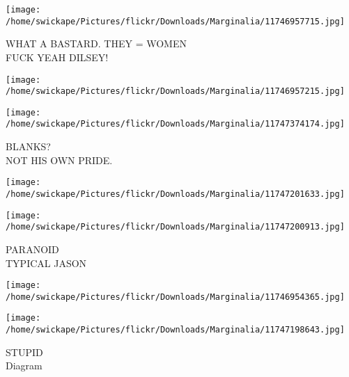 \documentclass[10pt,letterpaper]{article}
\begin{document}
\vspace{0.25in}
\texttt{[image: /home/swickape/Pictures/flickr/Downloads/Marginalia/11746957715.jpg]}

WHAT A BASTARD.  THEY = WOMEN\\
FUCK YEAH DILSEY!
\pagebreak

\texttt{[image: /home/swickape/Pictures/flickr/Downloads/Marginalia/11746957215.jpg]}

\vspace{0.25in}
\texttt{[image: /home/swickape/Pictures/flickr/Downloads/Marginalia/11747374174.jpg]}

BLANKS?\\
NOT HIS OWN PRIDE.
\pagebreak

\texttt{[image: /home/swickape/Pictures/flickr/Downloads/Marginalia/11747201633.jpg]}

\vspace{0.25in}
\texttt{[image: /home/swickape/Pictures/flickr/Downloads/Marginalia/11747200913.jpg]}

PARANOID\\
TYPICAL JASON
\pagebreak

\texttt{[image: /home/swickape/Pictures/flickr/Downloads/Marginalia/11746954365.jpg]}

\vspace{0.25in}
\texttt{[image: /home/swickape/Pictures/flickr/Downloads/Marginalia/11747198643.jpg]}

STUPID\\
Diagram
\pagebreak
\end{document}
